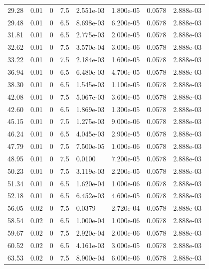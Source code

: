 \documentclass[preview]{standalone}
\begin{document}
{{\begin{tabular}{L{1.2cm}C{1.2cm} C{0.3cm}C{0.5cm} C{1.4cm}C{1.4cm} C{1.4cm}C{1.4cm}}
  29.28  &  0.01  & 0     & 7.5 &  2.551e-03  & 1.800e-05  & 0.0578 &  2.888e-03   \\ 
  29.48  &  0.01  & 0     & 6.5 &  8.698e-03  & 6.200e-05  & 0.0578 &  2.888e-03   \\ 
  31.81  &  0.01  & 0     & 6.5 &  2.775e-03  & 2.000e-05  & 0.0578 &  2.888e-03   \\ 
  32.62  &  0.01  & 0     & 7.5 &  3.570e-04  & 3.000e-06  & 0.0578 &  2.888e-03   \\ 
  33.22  &  0.01  & 0     & 7.5 &  2.184e-03  & 1.600e-05  & 0.0578 &  2.888e-03   \\ 
  36.94  &  0.01  & 0     & 6.5 &  6.480e-03  & 4.700e-05  & 0.0578 &  2.888e-03   \\ 
  38.30  &  0.01  & 0     & 6.5 &  1.545e-03  & 1.100e-05  & 0.0578 &  2.888e-03   \\ 
  42.08  &  0.01  & 0     & 7.5 &  5.067e-03  & 3.600e-05  & 0.0578 &  2.888e-03   \\ 
  42.60  &  0.01  & 0     & 6.5 &  1.869e-03  & 1.300e-05  & 0.0578 &  2.888e-03   \\ 
  45.15  &  0.01  & 0     & 7.5 &  1.275e-03  & 9.000e-06  & 0.0578 &  2.888e-03   \\ 
  46.24  &  0.01  & 0     & 6.5 &  4.045e-03  & 2.900e-05  & 0.0578 &  2.888e-03   \\ 
  47.79  &  0.01  & 0     & 7.5 &  7.500e-05  & 1.000e-06  & 0.0578 &  2.888e-03   \\ 
  48.95  &  0.01  & 0     & 7.5 &  0.0100  & 7.200e-05  & 0.0578 &  2.888e-03   \\ 
  50.23  &  0.01  & 0     & 7.5 &  3.119e-03  & 2.200e-05  & 0.0578 &  2.888e-03   \\ 
  51.34  &  0.01  & 0     & 6.5 &  1.620e-04  & 1.000e-06  & 0.0578 &  2.888e-03   \\ 
  52.18  &  0.01  & 0     & 6.5 &  6.452e-03  & 4.600e-05  & 0.0578 &  2.888e-03   \\ 
  56.05  &  0.02  & 0     & 7.5 &  0.0379  & 2.720e-04  & 0.0578 &  2.888e-03   \\ 
  58.54  &  0.02  & 0     & 6.5 &  1.000e-04  & 1.000e-06  & 0.0578 &  2.888e-03   \\ 
  59.67  &  0.02  & 0     & 7.5 &  2.920e-04  & 2.000e-06  & 0.0578 &  2.888e-03   \\ 
  60.52  &  0.02  & 0     & 6.5 &  4.161e-03  & 3.000e-05  & 0.0578 &  2.888e-03   \\ 
  63.53  &  0.02  & 0     & 7.5 &  8.900e-04  & 6.000e-06  & 0.0578 &  2.888e-03   \\ 

\end{tabular}}}
\end{document}
